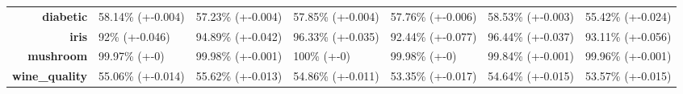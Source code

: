 \documentclass[preprint,review,12pt]{elsarticle}
\begin{document}
\begin{table}[!tb]
{\begin{tabular}{r|llllll}
			\textbf{diabetic}                  & \cellcolor[rgb]{ .604,  .808,  .498}58.14\% (+-0.004)                                              & \cellcolor[rgb]{ .996,  .902,  .514}57.23\% (+-0.004) & \cellcolor[rgb]{ .769,  .855,  .506}57.85\% (+-0.004) & \cellcolor[rgb]{ .82,  .871,  .51}57.76\% (+-0.006)   & \cellcolor[rgb]{ .388,  .745,  .482}58.53\% (+-0.003) & \cellcolor[rgb]{ .988,  .757,  .482}55.42\% (+-0.024) \\
			\textbf{iris}                      & \cellcolor[rgb]{ .996,  .902,  .514}92\% (+-0.046)                                                 & \cellcolor[rgb]{ .627,  .816,  .498}94.89\% (+-0.042) & \cellcolor[rgb]{ .408,  .753,  .486}96.33\% (+-0.035) & \cellcolor[rgb]{ 1,  .922,  .518}92.44\% (+-0.077)    & \cellcolor[rgb]{ .388,  .745,  .482}96.44\% (+-0.037) & \cellcolor[rgb]{ .902,  .894,  .514}93.11\% (+-0.056) \\
			\textbf{mushroom}                  & \cellcolor[rgb]{ .522,  .784,  .49}99.97\% (+-0)                                                   & \cellcolor[rgb]{ .471,  .769,  .49}99.98\% (+-0.001)  & \cellcolor[rgb]{ .388,  .745,  .482}100\% (+-0)       & \cellcolor[rgb]{ .471,  .769,  .49}99.98\% (+-0)      & \cellcolor[rgb]{ 1,  .922,  .518}99.84\% (+-0.001)    & \cellcolor[rgb]{ .537,  .788,  .494}99.96\% (+-0.001) \\
			\textbf{wine\_quality}             & \cellcolor[rgb]{ .541,  .788,  .494}55.06\% (+-0.014)                                              & \cellcolor[rgb]{ .388,  .745,  .482}55.62\% (+-0.013) & \cellcolor[rgb]{ .592,  .804,  .494}54.86\% (+-0.011) & \cellcolor[rgb]{ 1,  .922,  .518}53.35\% (+-0.017)    & \cellcolor[rgb]{ .651,  .824,  .498}54.64\% (+-0.015) & \cellcolor[rgb]{ .941,  .906,  .518}53.57\% (+-0.015) \\
		\end{tabular}%
	}
\end{table}%
\end{document}
